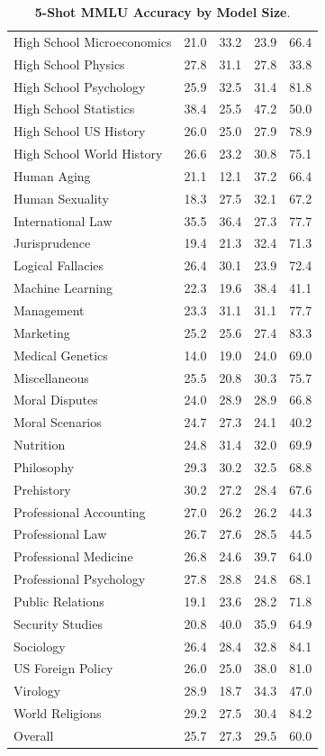 \documentclass[11pt, a4paper, logo, internal, copyright, nonumbering]{deepmind}
\begin{document}
\begin{table}[h!]
\begin{tabular}{lcccc}
High School Microeconomics & 21.0 & 33.2 & 23.9 & 66.4 \\
High School Physics & 27.8 & 31.1 & 27.8 & 33.8 \\
High School Psychology & 25.9 & 32.5 & 31.4 & 81.8 \\
High School Statistics & 38.4 & 25.5 & 47.2 & 50.0 \\
High School US History & 26.0 & 25.0 & 27.9 & 78.9 \\
High School World History & 26.6 & 23.2 & 30.8 & 75.1 \\
Human Aging & 21.1 & 12.1 & 37.2 & 66.4 \\
Human Sexuality & 18.3 & 27.5 & 32.1 & 67.2 \\
International Law & 35.5 & 36.4 & 27.3 & 77.7 \\
Jurisprudence & 19.4 & 21.3 & 32.4 & 71.3 \\
Logical Fallacies & 26.4 & 30.1 & 23.9 & 72.4 \\
Machine Learning & 22.3 & 19.6 & 38.4 & 41.1 \\
Management & 23.3 & 31.1 & 31.1 & 77.7 \\
Marketing & 25.2 & 25.6 & 27.4 & 83.3 \\
Medical Genetics & 14.0 & 19.0 & 24.0 & 69.0 \\
Miscellaneous & 25.5 & 20.8 & 30.3 & 75.7 \\
Moral Disputes & 24.0 & 28.9 & 28.9 & 66.8 \\
Moral Scenarios & 24.7 & 27.3 & 24.1 & 40.2 \\
Nutrition & 24.8 & 31.4 & 32.0 & 69.9 \\
Philosophy & 29.3 & 30.2 & 32.5 & 68.8 \\
Prehistory & 30.2 & 27.2 & 28.4 & 67.6 \\
Professional Accounting & 27.0 & 26.2 & 26.2 & 44.3 \\
Professional Law & 26.7 & 27.6 & 28.5 & 44.5 \\
Professional Medicine & 26.8 & 24.6 & 39.7 & 64.0 \\
Professional Psychology & 27.8 & 28.8 & 24.8 & 68.1 \\
Public Relations & 19.1 & 23.6 & 28.2 & 71.8 \\
Security Studies & 20.8 & 40.0 & 35.9 & 64.9 \\
Sociology & 26.4 & 28.4 & 32.8 & 84.1 \\
US Foreign Policy & 26.0 & 25.0 & 38.0 & 81.0 \\
Virology & 28.9 & 18.7 & 34.3 & 47.0 \\
World Religions & 29.2 & 27.5 & 30.4 & 84.2 \\
\hline
Overall & 25.7 & 27.3 & 29.5 & 60.0 \\
\bottomrule
    \end{tabular}
    \caption{\textbf{5-Shot MMLU Accuracy by Model Size}.}
    \label{tab:5_shot}
\end{table}
\newpage
\end{document}
